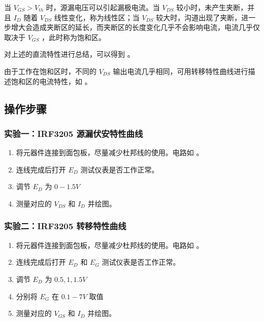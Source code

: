 \documentclass[lang=cn,11pt,a4paper,cite=authoryear]{elegantpaper}
\begin{document}
当 \(V_{GS} > V_{th}\) 时，源漏电压可以引起漏极电流。当 \(V_{DS}\) 较小时，未产生夹断，并且 \(I_D\) 随着 \(V_{DS}\) 线性变化，称为线性区；当 \(V_{DS}\) 较大时，沟道出现了夹断，进一步增大会造成夹断区的延长，而夹断区的长度变化几乎不会影响电流，电流几乎仅取决于 \(V_{GS}\) ，此时称为饱和区。

对上述的直流特性进行总结，可以得到  。


由于工作在饱和区时，不同的 \(V_{DS}\) 输出电流几乎相同，可用转移特性曲线进行描述饱和区的电流特性，如  。


\subsection{操作步骤}

\subsubsection{实验一：IRF3205 源漏伏安特性曲线}

\begin{enumerate}
    \item 将元器件连接到面包板，尽量减少杜邦线的使用。电路如  。
    \item 连线完成后打开 \(E_D\) 测试仪表是否工作正常。
    \item 调节 \(E_D\) 为 \(0-1.5 V\) 
    \item 测量对应的 \(V_{DS}\) 和  \(I_D\) 并绘图。
\end{enumerate}


\subsubsection{实验二：IRF3205 转移特性曲线}


\begin{enumerate}
    \item 将元器件连接到面包板，尽量减少杜邦线的使用。电路如  。
    \item 连线完成后打开 \(E_D\) 和 \(E_G\) 测试仪表是否工作正常。
    \item 调节 \(E_D\) 为 \(0.5, 1, 1.5 V\) 
    \item 分别将 \(E_G\) 在 \(0.1 - 7 V\) 取值
    \item 测量对应的 \(V_{GS}\) 和  \(I_D\) 并绘图。
\end{enumerate}
\end{document}
